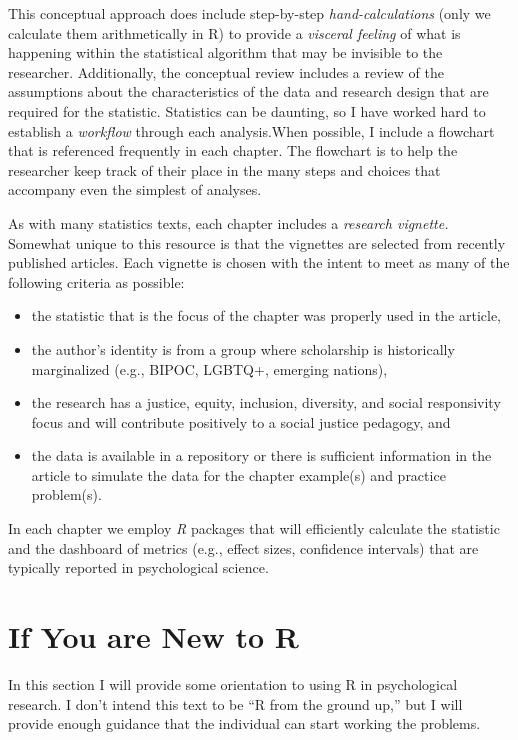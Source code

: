 \documentclass[
  english,
]{book}
\providecommand{\tightlist}{%
  \setlength{\itemsep}{0pt}\setlength{\parskip}{0pt}}
\begin{document}
This conceptual approach does include step-by-step \emph{hand-calculations} (only we calculate them arithmetically in R) to provide a \emph{visceral feeling} of what is happening within the statistical algorithm that may be invisible to the researcher. Additionally, the conceptual review includes a review of the assumptions about the characteristics of the data and research design that are required for the statistic. Statistics can be daunting, so I have worked hard to establish a \emph{workflow} through each analysis.When possible, I include a flowchart that is referenced frequently in each chapter. The flowchart is to help the researcher keep track of their place in the many steps and choices that accompany even the simplest of analyses.

As with many statistics texts, each chapter includes a \emph{research vignette.} Somewhat unique to this resource is that the vignettes are selected from recently published articles. Each vignette is chosen with the intent to meet as many of the following criteria as possible:

\begin{itemize}
\tightlist
\item
  the statistic that is the focus of the chapter was properly used in the article,
\item
  the author's identity is from a group where scholarship is historically marginalized (e.g., BIPOC, LGBTQ+, emerging nations),
\item
  the research has a justice, equity, inclusion, diversity, and social responsivity focus and will contribute positively to a social justice pedagogy, and
\item
  the data is available in a repository or there is sufficient information in the article to simulate the data for the chapter example(s) and practice problem(s).
\end{itemize}

In each chapter we employ \emph{R} packages that will efficiently calculate the statistic and the dashboard of metrics (e.g., effect sizes, confidence intervals) that are typically reported in psychological science.

\hypertarget{if-you-are-new-to-r}{%
\section{If You are New to R}\label{if-you-are-new-to-r}}

In this section I will provide some orientation to using R in psychological research. I don't intend this text to be ``R from the ground up,'' but I will provide enough guidance that the individual can start working the problems.
\end{document}
